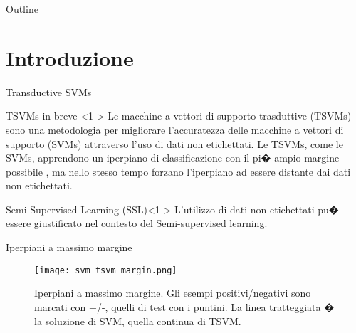 \documentclass[mathserif]{beamer}
\title[Elaborato di Apprendimento Automatico] %
{}
\subtitle
{Large Scale Transductive SVMs} %
\author[Andrea~Tarocchi, Marco~Magnatti] %
{Andrea~Tarocchi, Marco~Magnatti}
\date[Short Occasion] %
{8-1-2009}
\begin{document}
\begin{frame}
  \titlepage
\end{frame}

\begin{frame}{Outline}
  \tableofcontents
\end{frame}




\section{Introduzione}



\begin{frame}{Transductive SVMs}{}


\begin{block}{TSVMs in breve }<1-> 
Le macchine a vettori di supporto trasduttive (TSVMs) sono una metodologia per migliorare l'accuratezza delle macchine a vettori di supporto (SVMs) attraverso l'uso di dati non etichettati. Le TSVMs, come le SVMs, apprendono un iperpiano di classificazione con il pi� ampio margine possibile , ma nello stesso tempo forzano l'iperpiano \alert{ad essere distante dai dati non etichettati}. 

\end{block}

\begin{block}{Semi-Supervised Learning (SSL)}<1-> 
L'utilizzo di dati non etichettati pu� essere giustificato nel contesto del Semi-supervised learning.

\end{block}

\end{frame}


\begin{frame}{Iperpiani a massimo margine}

\begin{figure}[htbp]
	\centering
		\texttt{[image: svm\_tsvm\_margin.png]}
	\caption{Iperpiani a massimo margine. Gli esempi positivi/negativi sono marcati con +/-, quelli di test con i puntini. La linea tratteggiata � la soluzione di SVM, quella continua di TSVM.}
	\label{fig:gres}
\end{figure}
\end{frame}
\end{document}
